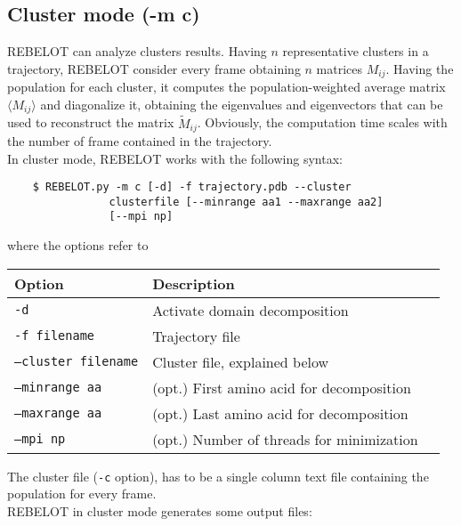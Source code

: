 \documentclass[a4paper,12pt]{book}
\begin{document}
\subsection{Cluster mode (-m c)}
\label{sec33:cluster}
REBELOT can analyze clusters results. Having $n$ representative clusters in a trajectory, REBELOT consider every frame obtaining $n$ matrices $M_{ij}$. Having the population for each cluster, it computes the population-weighted average matrix $\langle M_{ij} \rangle$ and diagonalize it, obtaining the eigenvalues and eigenvectors that can be used to reconstruct the matrix $\tilde{M}_{ij}$. Obviously, the computation time scales with the number of frame contained in the trajectory.\\
In cluster mode, REBELOT works with the following syntax:
\begin{lstlisting}
	$ REBELOT.py -m c [-d] -f trajectory.pdb --cluster 
				clusterfile [--minrange aa1 --maxrange aa2]
				[--mpi np]
\end{lstlisting}
where the options refer to
\begin{center}
\begin{tabular}{lll}
\toprule
Option & Description\\
\midrule
\texttt{-d}  & Activate domain decomposition \\
\texttt{-f filename}   & Trajectory file \\
\texttt{--cluster filename}   & Cluster file, explained below \\
\texttt{--minrange aa}  & (opt.) First amino acid for decomposition \\
\texttt{--maxrange aa}  & (opt.) Last amino acid for decomposition \\
\texttt{--mpi np}  & (opt.) Number of threads for minimization \\
\bottomrule
\end{tabular}
\end{center}
The cluster file (\texttt{-c} option), has to be a single column text file containing the population for every frame. \\
REBELOT in cluster mode generates some output files:
\end{document}
